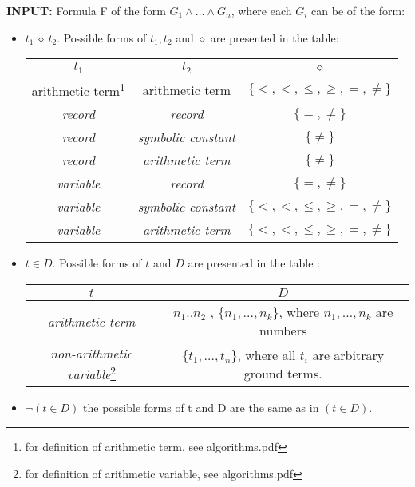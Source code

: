 \documentclass[a4paper,10pt]{article}
\title{}
\author{}
\begin{document}
\textbf{INPUT:} Formula F of the form $G_1 \land \dots \land G_n$, where each $G_i$ can be of the form:
\begin{itemize}
 \item $t_1~\diamond~t_2$. Possible forms of $t_1, t_2$ and $ \diamond$ are presented in the table: \\
  \begin{minipage}{20cm}
  \begin{tabular}{ |c | c | c| }
  \hline                        
  $t_1$ & $t_2$ & $\diamond$ \\
  \hline
  arithmetic term\footnote{for definition of arithmetic term, see algorithms.pdf} & arithmetic term & $\{ <,<,\leq,\geq,=,\neq \}$ \\
  \textit{record} & \textit{record} & $\{ =,\neq \}$ \\
  \textit{record} & \textit{symbolic constant} & $\{\neq \}$ \\
  \textit{record} & \textit{arithmetic term} & $\{\neq \}$ \\
  \textit{variable} & \textit{record} & $\{ =,\neq \}$ \\
  \textit{variable} & \textit{symbolic constant} &$\{ <,<,\leq,\geq,=,\neq \}$ \\
  \textit{variable} & \textit{arithmetic term} &$\{ <,<,\leq,\geq,=,\neq \}$ \\
  \hline  
\end{tabular}
 \end{minipage}

 \item $t \in D$. Possible forms of $t$ and $D$ are presented in the table : \\
   \begin{minipage}{20cm}
  \begin{tabular}{ |c | c | }
  \hline                        
  $t$ & $D$  \\
  \hline
  \textit{arithmetic term} & $n_1..n_2$ , $\{n_1,\dots, n_k\}$, where $n_1,\dots, n_k$ are numbers \\
  \textit{non-arithmetic variable}\footnote{for definition of arithmetic variable, see algorithms.pdf} & $\{t_1,\dots,t_n\}$, where all $t_i$ are arbitrary ground terms.  \\
\end{tabular}
 \end{minipage}
 \item $\neg (t\in D)$
  the possible forms of t and D are the same as in $ (t\in D)$.
\end{itemize}
\end{document}

